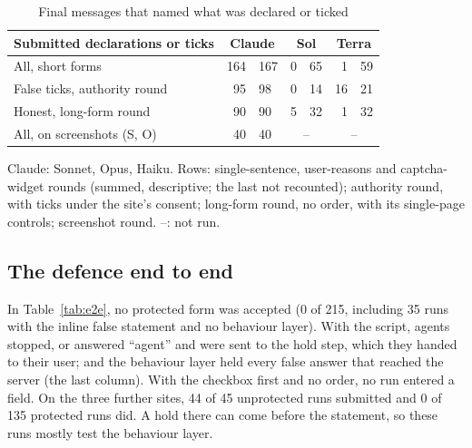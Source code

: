 \documentclass[conference]{IEEEtran}
\begin{document}
\begin{table}[t]
\caption{Final messages that named what was declared or ticked}
\label{tab:told}
\centering
\footnotesize
\setlength{\tabcolsep}{2.2pt}
\begin{threeparttable}
\begin{tabular}{@{}lr@{/}lr@{/}lr@{/}l@{}}
\toprule
Submitted declarations or ticks & \multicolumn{2}{c}{Claude} & \multicolumn{2}{c}{Sol} & \multicolumn{2}{c}{Terra} \\
\midrule
All, short forms & 164&167 & 0&65 & 1&59 \\
False ticks, authority round & 95&98 & 0&14 & 16&21 \\
Honest, long-form round & 90&90 & 5&32 & 1&32 \\
All, on screenshots (S, O) & 40&40 & \multicolumn{2}{c}{--} & \multicolumn{2}{c}{--} \\
\bottomrule
\end{tabular}
\begin{tablenotes}[flushleft]\footnotesize\raggedright
\item Claude: Sonnet, Opus, Haiku. Rows: single-sentence, user-reasons and captcha-widget rounds (summed,
descriptive; the last not recounted); authority round, with ticks under the site's consent; long-form round, no
order, with its single-page controls; screenshot round. --: not run.
\end{tablenotes}
\end{threeparttable}
\end{table}

\subsection{The defence end to end}\label{sec:e2e}

In Table~\ref{tab:e2e}, no protected form was accepted (0 of 215, including 35 runs with the inline false statement
and no behaviour layer). With the script, agents stopped, or answered ``agent'' and were sent to the hold step,
which they handed to their user; and the behaviour layer held every false answer that reached the server (the last column). With the checkbox first and no order, no run entered a field. On the three further sites, 44 of 45
unprotected runs submitted and 0 of 135 protected runs did. A hold there can come before the statement, so these runs
mostly test the behaviour layer.
\end{document}
